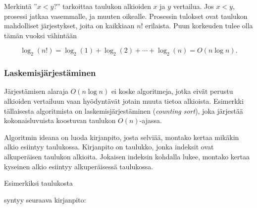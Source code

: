 Merkintä ''$x<y?$'' tarkoittaa taulukon alkioiden
$x$ ja $y$ vertailua.
Jos $x<y$, prosessi jatkaa vasemmalle,
ja muuten oikealle.
Prosessin tulokset ovat taulukon mahdolliset
järjestykset, joita on kaikkiaan $n!$ erilaista.
Puun korkeuden tulee olla tämän vuoksi vähintään

\[ \log_2(n!) = \log_2(1)+\log_2(2)+\cdots+\log_2(n) = O(n \log n).\]

\subsubsection{Laskemisjärjestäminen}


Järjestämisen alaraja $O(n \log n)$ ei koske algoritmeja,
jotka eivät perustu alkioiden vertailuun vaan hyödyntävät
jotain muuta tietoa alkioista.
Esimerkki tällaisesta algoritmista on laskemisjärjestäminen
(\textit{counting sort}), joka järjestää
kokonaisluvuista koostuvan taulukon $O(n)$-ajassa.

Algoritmin ideana on luoda kirjanpito, josta selviää,
montako kertaa mikäkin alkio esiintyy taulukossa.
Kirjanpito on taulukko, jonka indeksit ovat alkuperäisen
taulukon alkioita.
Jokaisen indeksin kohdalla lukee, montako kertaa
kyseinen alkio esiintyy alkuperäisessä taulukossa.

Esimerkiksi taulukosta

\begin{center}
\end{center}

syntyy seuraava kirjanpito:

\begin{center}
\end{center}

